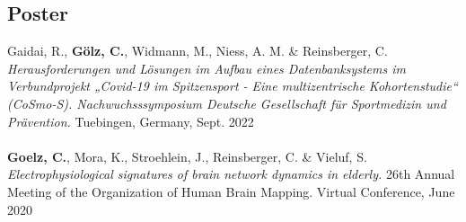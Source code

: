 \subsection*{Poster}
Gaidai, R., \textbf{Gölz, C.}, Widmann, M., Niess, A. M. \& Reinsberger, C. \textit{Herausforderungen und Lösungen im Aufbau eines Datenbanksystems im Verbundprojekt „Covid-19 im Spitzensport - Eine multizentrische Kohortenstudie“ (CoSmo-S). Nachwuchsssymposium Deutsche Gesellschaft für Sportmedizin und Prävention.} Tuebingen, Germany, Sept. 2022\\
\\
\textbf{Goelz, C.}, Mora, K., Stroehlein, J., Reinsberger, C. \& Vieluf, S. \textit{Electrophysiological signatures of brain network dynamics in elderly.} 26th Annual Meeting of the Organization of Human Brain Mapping. Virtual Conference, June 2020 \\
\\

